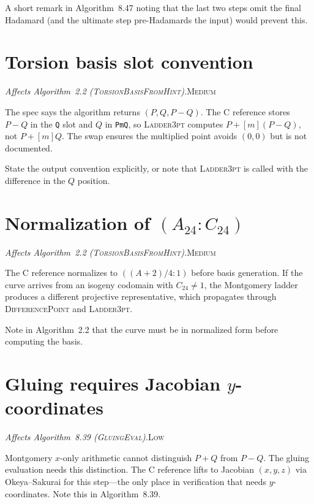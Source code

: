 \documentclass[a4paper,11pt]{article}
\newcommand{\algo}[1]{Algorithm~#1}
\newcommand{\medium}{\textsc{\color{RoyalBlue}Medium}}
\newcommand{\low}{\textsc{\color{OliveGreen}Low}}
\newcommand{\finding}[2]{\noindent\textit{#1}\hfill#2\par\smallskip}
\begin{document}
A short remark in \algo{8.47} noting that the last two steps omit the
final Hadamard (and the ultimate step pre-Hadamards the input) would
prevent this.

\section{Torsion basis slot convention}
\label{sec:basis-swap}

\finding{Affects \algo{2.2}
(\textsc{TorsionBasisFromHint}).}{\medium}

The spec says the algorithm returns $(P, Q, P{-}Q)$.  The C reference
stores $P{-}Q$ in the \texttt{Q} slot and $Q$ in \texttt{PmQ}, so
\textsc{Ladder3pt} computes $P + [m](P{-}Q)$, not $P + [m]Q$.  The swap
ensures the multiplied point avoids $(0,0)$ but is not documented.

State the output convention explicitly, or note that \textsc{Ladder3pt}
is called with the difference in the $Q$ position.

\section{Normalization of $(A_{24} : C_{24})$}
\label{sec:normalize-a24}

\finding{Affects \algo{2.2}
(\textsc{TorsionBasisFromHint}).}{\medium}

The C reference normalizes to $((A{+}2)/4 : 1)$ before basis generation.
If the curve arrives from an isogeny codomain with $C_{24} \neq 1$, the
Montgomery ladder produces a different projective representative, which
propagates through \textsc{DifferencePoint} and \textsc{Ladder3pt}.

Note in \algo{2.2} that the curve must be in normalized form before
computing the basis.

\section{Gluing requires Jacobian $y$-coordinates}
\label{sec:gluing-jacobian}

\finding{Affects \algo{8.39} (\textsc{GluingEval}).}{\low}

Montgomery $x$-only arithmetic cannot distinguish $P+Q$ from $P-Q$.  The
gluing evaluation needs this distinction.  The C reference lifts to
Jacobian $(x,y,z)$ via Okeya--Sakurai for this step---the only place in
verification that needs $y$-coordinates.  Note this in \algo{8.39}.
\end{document}
